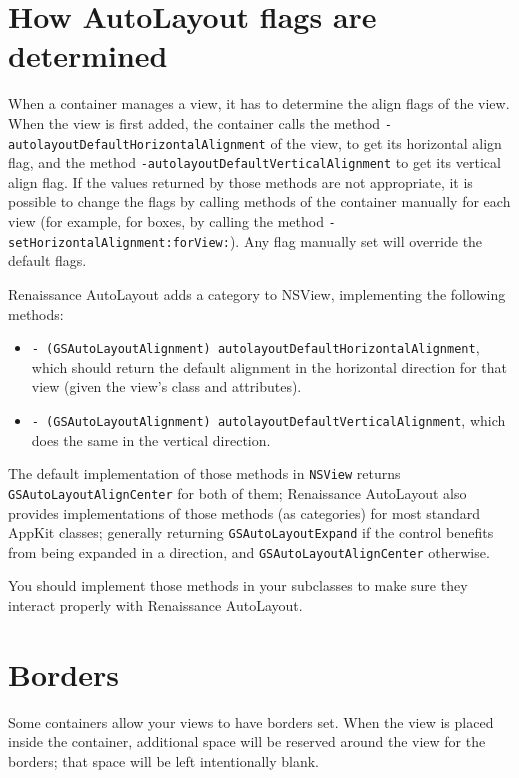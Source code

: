\section{How AutoLayout flags are determined}

When a container manages a view, it has to determine the align flags
of the view.  When the view is first added, the container calls the
method \texttt{-autolayoutDefaultHorizontalAlignment} of the view, to
get its horizontal align flag, and the method
\texttt{-autolayoutDefaultVerticalAlignment} to get its vertical align
flag.  If the values returned by those methods are not appropriate, it
is possible to change the flags by calling methods of the container
manually for each view (for example, for boxes, by calling the method
\texttt{-setHorizontalAlignment:forView:}).  Any flag manually set will
override the default flags.

Renaissance AutoLayout adds a category to NSView, implementing the
following methods:

\begin{itemize}
\item \texttt{- (GSAutoLayoutAlignment) autolayoutDefaultHorizontalAlignment},
which should return the default alignment in the horizontal direction
for that view (given the view's class and attributes).
\item \texttt{- (GSAutoLayoutAlignment) autolayoutDefaultVerticalAlignment},
which does the same in the vertical direction.
\end{itemize}

The default implementation of those methods in \texttt{NSView} returns
\texttt{GSAutoLayoutAlignCenter} for both of them; Renaissance AutoLayout 
also provides implementations of those methods (as categories) for
most standard AppKit classes; generally returning
\texttt{GSAutoLayoutExpand} if the control benefits from being expanded 
in a direction, and \texttt{GSAutoLayoutAlignCenter} otherwise.

You should implement those methods in your subclasses to make sure
they interact properly with Renaissance AutoLayout.

\section{Borders}

Some containers allow your views to have borders set.  When the view
is placed inside the container, additional space will be reserved
around the view for the borders; that space will be left intentionally
blank.

